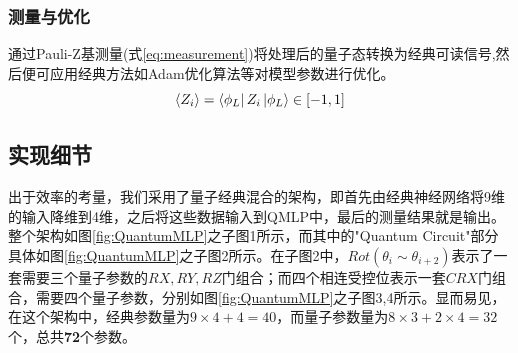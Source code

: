 \documentclass[10pt,a4paper,twoside]{article}
\numberwithin{figure}{section}%
\numberwithin{table}{section}%
\begin{document}
\subsubsection{测量与优化}
通过Pauli-Z基测量(式\ref{eq:measurement})将处理后的量子态转换为经典可读信号,然后便可应用经典方法如Adam优化算法等对模型参数进行优化。
\begin{equation}
    \langle Z_i \rangle = \bra{\phi_L} Z_i \ket{\phi_L} \in [-1, 1]
    \label{eq:measurement}
\end{equation}


\subsection{实现细节}

出于效率的考量，我们采用了量子经典混合的架构，即首先由经典神经网络将9维的输入降维到4维，之后将这些数据输入到QMLP中，最后的测量结果就是输出。整个架构如图\ref{fig:QuantumMLP}之子图1所示，而其中的"Quantum Circuit"部分具体如图\ref{fig:QuantumMLP}之子图2所示。在子图2中，$Rot(\theta_{i}\sim\theta_{i+2})$表示了一套需要三个量子参数的$RX,RY,RZ$门组合；而四个相连受控位表示一套$CRX$门组合，需要四个量子参数，分别如图\ref{fig:QuantumMLP}之子图3,4所示。显而易见，在这个架构中，经典参数量为$9\times4+4=40$，而量子参数量为$8\times3+2\times4=32$个，总共\textbf{72}个参数。
\end{document}

